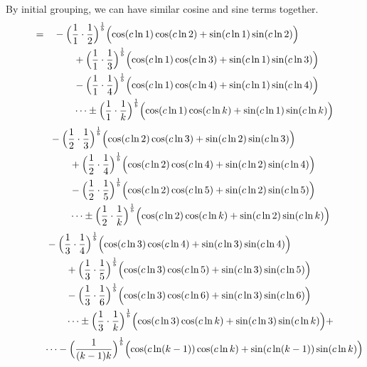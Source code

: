 \documentclass{amsart}
\begin{document}
	\[\]
	By initial grouping, we can have similar cosine and sine terms together.
	\[
	\begin{aligned}
		= \quad & -\Bigl( \frac{1}{1} \cdot \frac{1}{2} \Bigr)^\frac1b \Bigl( \cos(c \ln1) \cos(c \ln2) + \sin(c \ln1) \sin(c \ln2) \Bigr) \\
		& \qquad +\Bigl( \frac{1}{1} \cdot \frac{1}{3} \Bigr)^\frac1b \Bigl( \cos(c \ln1) \cos(c \ln3) + \sin(c \ln1) \sin(c \ln3) \Bigr) \\
		& \qquad -\Bigl( \frac{1}{1} \cdot \frac{1}{4} \Bigr)^\frac1b \Bigl( \cos(c \ln1) \cos(c \ln4) + \sin(c \ln1) \sin(c \ln4) \Bigr) \\
		& \qquad \dots  \pm \Bigl( \frac{1}{1} \cdot \frac{1}{k} \Bigr)^\frac1b \Bigl( \cos(c \ln1) \cos(c \ln k) + \sin(c \ln1) \sin(c \ln k) \Bigr)
	\end{aligned}
	\]
	\[
	\begin{aligned}
		\quad & -\Bigl( \frac{1}{2} \cdot \frac{1}{3} \Bigr)^\frac1b \Bigl( \cos(c \ln2) \cos(c \ln3) + \sin(c \ln2) \sin(c \ln3) \Bigr) \\
		& \qquad +\Bigl( \frac{1}{2} \cdot \frac{1}{4} \Bigr)^\frac1b \Bigl( \cos(c \ln2) \cos(c \ln4) + \sin(c \ln2) \sin(c \ln4) \Bigr) \\
		& \qquad -\Bigl( \frac{1}{2} \cdot \frac{1}{5} \Bigr)^\frac1b \Bigl( \cos(c \ln2) \cos(c \ln5) + \sin(c \ln2) \sin(c \ln5) \Bigr) \\
		& \qquad \dots  \pm \Bigl( \frac{1}{2} \cdot \frac{1}{k} \Bigr)^\frac1b \Bigl( \cos(c \ln2) \cos(c \ln k) + \sin(c \ln2) \sin(c \ln k) \Bigr) 
	\end{aligned}
	\]
	\[
	\begin{aligned}
		\quad & -\Bigl( \frac{1}{3} \cdot \frac{1}{4} \Bigr)^\frac1b \Bigl( \cos(c \ln3) \cos(c \ln4) + \sin(c \ln3) \sin(c \ln4) \Bigr) \\
		& \qquad +\Bigl( \frac{1}{3} \cdot \frac{1}{5} \Bigr)^\frac1b \Bigl( \cos(c \ln3) \cos(c \ln5) + \sin(c \ln3) \sin(c \ln5) \Bigr) \\
		& \qquad -\Bigl( \frac{1}{3} \cdot \frac{1}{6} \Bigr)^\frac1b \Bigl( \cos(c \ln3) \cos(c \ln6) + \sin(c \ln3) \sin(c \ln6) \Bigr) \\
		& \qquad \dots  \pm \Bigl( \frac{1}{3} \cdot \frac{1}{k} \Bigr)^\frac1b \Bigl( \cos(c \ln3) \cos(c \ln k) + \sin(c \ln3) \sin(c \ln k) \Bigr) + 
	\end{aligned}
	\]
	\[ \qquad\qquad \dots - \Bigl( \frac{1}{(k-1)k} \Bigr)^\frac1b \Bigl( \cos(c \ln (k-1)) \cos(c \ln k) + \sin(c \ln (k-1)) \sin(c \ln k) \Bigr) \]
	
\end{document}
